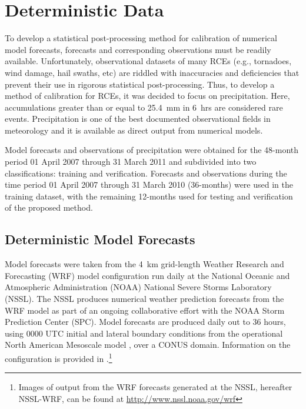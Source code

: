 

\section{Deterministic Data}
\label{ddata}

To develop a statistical post-processing method for calibration of numerical model forecasts, forecasts and corresponding observations must be readily available. Unfortunately, observational datasets of many RCEs (e.g., tornadoes, wind damage, hail swaths, etc) are riddled with inaccuracies and deficiencies \citep{Doswell1988, Weiss2002, Trapp2006, Ortega2009} that prevent their use in rigorous statistical post-processing. Thus, to develop a method of calibration for RCEs, it was decided to focus on precipitation. Here, accumulations greater than or equal to \mbox{25.4 mm} in \mbox{6 hrs} are considered rare events. Precipitation is one of the best documented observational fields in meteorology and it is available as direct output from numerical models.

Model forecasts and observations of precipitation were obtained for the 48-month period 01 April 2007 through 31 March 2011 and subdivided into two classifications: training and verification. Forecasts and observations during the time period 01 April 2007 through 31 March 2010 (36-months) were used in the training dataset, with the remaining 12-months used for testing and verification of the proposed method.




\subsection{Deterministic Model Forecasts}
\label{dmodel}

Model forecasts were taken from the \mbox{4 km} grid-length Weather Research and Forecasting (WRF) model configuration \citep{WRFV3} run daily at the National Oceanic and Atmospheric Administration (NOAA) National Severe Storms Laboratory (NSSL). The NSSL produces numerical weather prediction forecasts from the WRF model as part of an ongoing collaborative effort with the NOAA Storm Prediction Center (SPC). Model forecasts are produced daily out to 36 hours, using 0000 UTC initial and lateral boundary conditions from the operational North American Mesoscale model \citep{NAM}, over a CONUS domain. Information on the configuration is provided in \cite{Kain2010}.\footnote{Images of output from the WRF forecasts generated at the NSSL, hereafter NSSL-WRF, can be found at \url{http://www.nssl.noaa.gov/wrf}}




